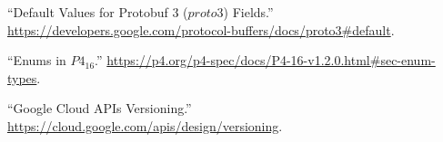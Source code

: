 \documentclass[11pt]{article}
\begin{document}
{{\begin{thebibliography}{38}
\mdbibitemlabel{{}[4]}\textquotedblleft{}Default Values for Protobuf 3 ($proto3$) Fields.\textquotedblright{} \href{https://developers.google.com/protocol-buffers/docs/proto3\%23default}{{\ttfamily https://\hspace{0pt}developers.\hspace{0pt}google.\hspace{0pt}com/\hspace{0pt}protocol-\hspace{0pt}buffers/\hspace{0pt}docs/\hspace{0pt}proto3\#\hspace{0pt}default}}.\label{protodefaults}%

\mdbibitemlabel{{}[5]}\textquotedblleft{}Enums in $P4_{16}$.\textquotedblright{} \href{https://p4.org/p4-spec/docs/P4-16-v1.2.0.html\%23sec-enum-types}{{\ttfamily https://\hspace{0pt}p4.\hspace{0pt}org/\hspace{0pt}p4-\hspace{0pt}spec/\hspace{0pt}docs/\hspace{0pt}P4-\hspace{0pt}16-\hspace{0pt}v1.\hspace{0pt}2.\hspace{0pt}0.\hspace{0pt}html\#\hspace{0pt}sec-\hspace{0pt}enum-\hspace{0pt}types}}.\label{p4enums}%

\mdbibitemlabel{{}[6]}\textquotedblleft{}Google Cloud APIs Versioning.\textquotedblright{} \href{https://cloud.google.com/apis/design/versioning}{{\ttfamily https://\hspace{0pt}cloud.\hspace{0pt}google.\hspace{0pt}com/\hspace{0pt}apis/\hspace{0pt}design/\hspace{0pt}versioning}}.\label{apiversioning}%


\end{thebibliography}}}
\end{document}
